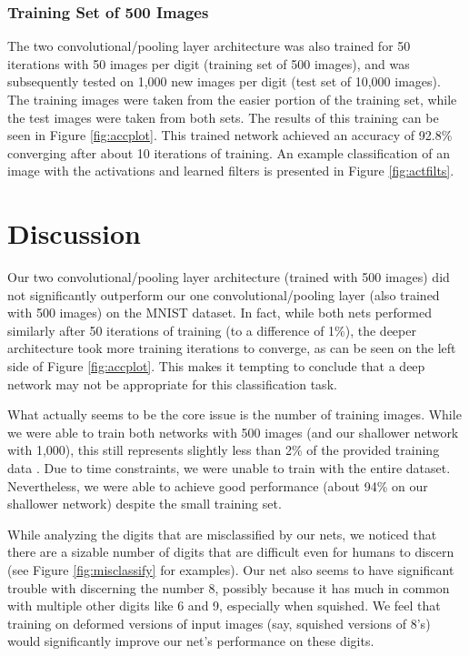 \documentclass[10pt,twocolumn,letterpaper]{article}
\begin{document}
\subsubsection{Training Set of 500 Images}

The two convolutional/pooling layer architecture was also trained for 50 iterations with 50 images per digit
(training set of 500 images), and was subsequently tested on 1,000 new images per digit
(test set of 10,000 images).
The training images were taken from the easier portion of the training set,
while the test images were taken from both sets.
The results of this training can be seen in Figure \ref{fig:accplot}. This trained network achieved an accuracy of 92.8\% converging after about 10 iterations of training.
An example classification of an image with the activations and learned filters is presented
in Figure \ref{fig:actfilts}.

\section{Discussion}

Our two convolutional/pooling layer architecture (trained with 500 images) did not significantly outperform
our one convolutional/pooling layer (also trained with 500 images) on the MNIST dataset. In fact, while both nets
performed similarly after 50 iterations of training (to a difference of 1\%), the deeper architecture took more
training iterations to converge, as can be seen on the left side of Figure \ref{fig:accplot}.
This makes it tempting to conclude that a deep network may not be appropriate for this classification task.

What actually seems to be the core issue is the number of training images. While we were able to train both
networks with 500 images (and our shallower network with 1,000), this still represents slightly less than 2\% of
the provided training data \cite{MNIST}. Due to time constraints, we were unable to train with the entire dataset.
Nevertheless, we were able to achieve good performance (about 94\% on our shallower network) despite the small
training set.

While analyzing the digits that are misclassified by our nets, we noticed that there are a sizable number of
digits that are difficult even for humans to discern (see Figure \ref{fig:misclassify} for examples). Our net also seems to have
significant trouble with discerning the number 8, possibly because it has much in common with multiple other
digits like 6 and 9, especially when squished. We feel that training on deformed versions of input images
(say, squished versions of 8's) would significantly improve our net's performance on these digits.
\end{document}
